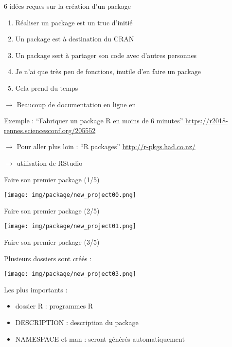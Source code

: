 \documentclass[10pt,xcolor=table,color={dvipsnames,usenames},ignorenonframetext,usepdftitle=false,french]{beamer}
\providecommand{\tightlist}{%
  \setlength{\parskip}{0pt}
  }
\begin{document}
\begin{frame}{6 idées reçues sur la création d'un package}
\protect\hypertarget{idees-recues-sur-la-creation-dun-package}{}

\begin{enumerate}
\item
  Réaliser un package est un truc d'initié
\item
  Un package est à destination du CRAN
\item
  Un package sert à partager son code avec d'autres personnes
\item
  Je n'ai que très peu de fonctions, inutile d'en faire un package
\item
  Cela prend du temps
\end{enumerate}

\(\rightarrow\) Beaucoup de documentation en ligne en \bcdfrance

Exemple : ``Fabriquer un package R en moins de 6 minutes''
\url{https://r2018-rennes.sciencesconf.org/205552}

\(\rightarrow\) Pour aller plus loin : ``R packages''
\url{http://r-pkgs.had.co.nz/}

\(\rightarrow\) utilisation de RStudio

\end{frame}

\begin{frame}{Faire son premier package (1/5)}
\protect\hypertarget{faire-son-premier-package-15}{}

\texttt{[image: img/package/new\_project00.png]}

\end{frame}

\begin{frame}{Faire son premier package (2/5)}
\protect\hypertarget{faire-son-premier-package-25}{}

\texttt{[image: img/package/new\_project01.png]}

\end{frame}

\begin{frame}{Faire son premier package (3/5)}
\protect\hypertarget{faire-son-premier-package-35}{}

Plusieurs dossiers sont créés :

\texttt{[image: img/package/new\_project03.png]}

Les plus importants :

\begin{itemize}
\tightlist
\item
  dossier R : programmes R
\item
  DESCRIPTION : description du package
\item
  NAMESPACE et man : seront générés automatiquement
\end{itemize}

\end{frame}
\end{document}
